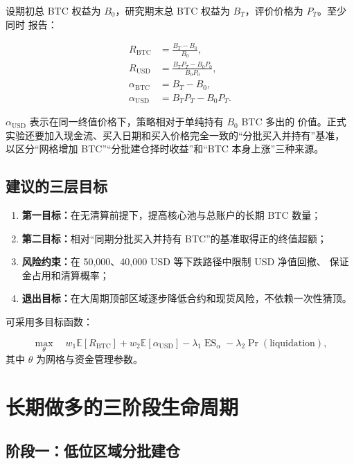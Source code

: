 \documentclass[11pt,a4paper,fontset=none]{ctexart}
\begin{document}
设期初总 BTC 权益为 $B_0$，研究期末总 BTC 权益为 $B_T$，评价价格为 $P_T$。至少同时
报告：

\begin{align}
  R_{\mathrm{BTC}} &= \frac{B_T-B_0}{B_0},\\
  R_{\mathrm{USD}} &= \frac{B_TP_T-B_0P_0}{B_0P_0},\\
  \alpha_{\mathrm{BTC}} &= B_T-B_0,\\
  \alpha_{\mathrm{USD}} &= B_TP_T-B_0P_T.
\end{align}

$\alpha_{\mathrm{USD}}$ 表示在同一终值价格下，策略相对于单纯持有 $B_0$ BTC 多出的
价值。正式实验还要加入现金流、买入日期和买入价格完全一致的“分批买入并持有”基准，
以区分“网格增加 BTC”“分批建仓择时收益”和“BTC 本身上涨”三种来源。

\subsection{建议的三层目标}

\begin{enumerate}
  \item \textbf{第一目标：}在无清算前提下，提高核心池与总账户的长期 BTC 数量；
  \item \textbf{第二目标：}相对“同期分批买入并持有 BTC”的基准取得正的终值超额；
  \item \textbf{风险约束：}在 50,000、40,000 USD 等下跌路径中限制 USD 净值回撤、
        保证金占用和清算概率；
  \item \textbf{退出目标：}在大周期顶部区域逐步降低合约和现货风险，不依赖一次性猜顶。
\end{enumerate}

可采用多目标函数：

\begin{equation}
  \max_{\theta}\quad
  w_1\mathbb{E}[R_{\mathrm{BTC}}]
  +w_2\mathbb{E}[\alpha_{\mathrm{USD}}]
  -\lambda_1\operatorname{ES}_{\alpha}
  -\lambda_2\Pr(\text{liquidation}),
\end{equation}
其中 $\theta$ 为网格与资金管理参数。

\section{长期做多的三阶段生命周期}

\subsection{阶段一：低位区域分批建仓}
\end{document}
